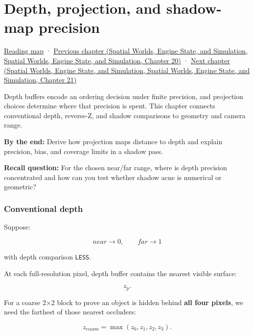 \hypertarget{06-engine-ii-ch030}{}
\chapter{Depth, projection, and shadow-map precision}\label{stagechapter:06-engine-ii-ch030}\label{06-engine-ii-ch030-depth-projection-and-shadow-map-precision}

\hyperref[volume-reading-map]{Reading map} · \href{../05-Spatial-Worlds-Engine-State-and-Simulation/main.pdf\#nameddest=06-engine-ii-ch029-dynamic-spatial-indices-for-moving-worlds}{Previous chapter (Spatial Worlds, Engine State, and Simulation, Spatial Worlds, Engine State, and Simulation, Chapter 20)} · \href{../05-Spatial-Worlds-Engine-State-and-Simulation/main.pdf\#nameddest=06-engine-ii-ch031-spatial-index-serialization-and-query-evidence}{Next chapter (Spatial Worlds, Engine State, and Simulation, Spatial Worlds, Engine State, and Simulation, Chapter 21)}

Depth buffers encode an ordering decision under finite precision, and projection choices determine where that precision is spent. This chapter connects conventional depth, reverse-Z, and shadow comparisons to geometry and camera range.

\textbf{By the end:} Derive how projection maps distance to depth and explain precision, bias, and coverage limits in a shadow pass.

\textbf{Recall question:} For the chosen near/far range, where is depth precision concentrated and how can you test whether shadow acne is numerical or geometric?

\subsection{Conventional depth}\label{06-engine-ii-ch030-conventional-depth}

Suppose:

\[
near\rightarrow0,
\qquad
far\rightarrow1
\]

with depth comparison \texttt{LESS}.

At each full-resolution pixel, depth buffer contains the nearest visible surface:

\[
z_p.
\]

For a coarse 2×2 block to prove an object is hidden behind \textbf{all four pixels}, we need the farthest of those nearest occluders:

\[
\boxed{
z_{\text{coarse}}
=
\max(z_0,z_1,z_2,z_3).
}
\]

